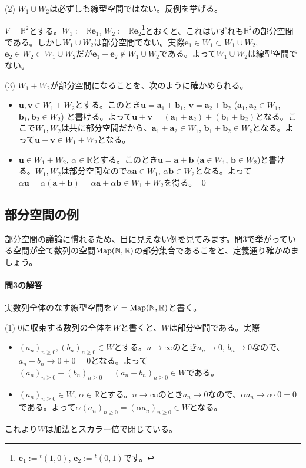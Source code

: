 \noindent (2) $W_1\cup W_2$は必ずしも線型空間ではない。反例を挙げる。

$V = \mathbb{R}^2$とする。$W_1 := \mathbb{R}\bm{e}_1$, $W_2 := \mathbb{R}\bm{e}_2$\footnote{$\bm{e}_1 := {}^t(1,0)$, $\bm{e}_2 := {}^t(0,1)$です。}とおくと、これはいずれも$\mathbb{R}^2$の部分空間である。しかし$W_1 \cup W_2$は部分空間でない。実際$\bm{e}_1\in W_1 \subset W_1 \cup W_2$, $\bm{e}_2\in W_2 \subset W_1 \cup W_2$だが$\bm{e}_1 + \bm{e}_2 \not\in W_1\cup W_2$である。よって$W_1\cup W_2$は線型空間でない。

\noindent (3) $W_1 + W_2$が部分空間になることを、次のように確かめられる。
\begin{itemize}
\item $\bm{u}, \bm{v}\in W_1 +  W_2$とする。このとき$\bm{u} = \bm{a}_1 + \bm{b}_1$, $\bm{v} = \bm{a}_2 + \bm{b}_2$ ($\bm{a}_1, \bm{a}_2 \in W_1$, $\bm{b}_1, \bm{b}_2\in W_2$) と書ける。よって$\bm{u} + \bm{v} = (\bm{a}_1 + \bm{a}_2) + (\bm{b}_1 + \bm{b}_2)$となる。ここで$W_1, W_2$は共に部分空間だから、$\bm{a}_1 + \bm{a}_2 \in W_1$, $\bm{b}_1 + \bm{b}_2 \in W_2$となる。よって$\bm{u} + \bm{v} \in W_1 +  W_2$となる。
\item $\bm{u}\in W_1 +  W_2$, $\alpha\in\mathbb{R}$とする。このとき$\bm{u} = \bm{a} + \bm{b}$ ($\bm{a} \in W_1$, $\bm{b} \in W_2$)と書ける。$W_1, W_2$は部分空間なので$\alpha\bm{a} \in W_1$, $\alpha\bm{b} \in W_2$となる。よって$\alpha\bm{u} = \alpha(\bm{a} + \bm{b}) = \alpha\bm{a} + \alpha\bm{b}\in W_1 +  W_2$を得る。 \qed
\end{itemize}

\subsection{部分空間の例}

部分空間の議論に慣れるため、目に見えない例を見てみます。問$3$で挙がっている空間が全て数列の空間$\operatorname{Map}(\mathbb{N}, \mathbb{R})$の部分集合であるこをと、定義通り確かめましょう。

\paragraph{問3の解答} 実数列全体のなす線型空間を$V=\operatorname{Map}(\mathbb{N}, \mathbb{R})$と書く。

\noindent (1) $0$に収束する数列の全体を$W$と書くと、$W$は部分空間である。実際
\begin{itemize}
\item $(a_n)_{n \geq 0}, (b_n)_{n \geq 0}\in W$とする。$n\rightarrow\infty$のとき$a_n\rightarrow 0$, $b_n\rightarrow 0$なので、$a_n + b_n \rightarrow 0 + 0 = 0$となる。よって$(a_n)_{n \geq 0} + (b_n)_{n \geq 0} = (a_n + b_n)_{n \geq 0}\in W$である。
\item $(a_n)_{n \geq 0}\in W$, $\alpha\in\mathbb{R}$とする。$n\rightarrow\infty$のとき$a_n \rightarrow 0$なので、$\alpha a_n \rightarrow \alpha \cdot 0 = 0$である。よって$\alpha (a_n)_{n \geq 0} = (\alpha a_n)_{n \geq 0}\in W$となる。
\end{itemize}
これより$W$は加法とスカラー倍で閉じている。

